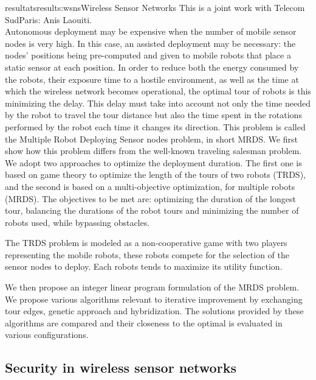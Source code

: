\documentclass{ra2016}
\begin{document}
\begin{module}{resultats}{results:wsns}{Wireless Sensor Networks}
This is a joint work with Telecom SudParis: Anis Laouiti.\\

Autonomous deployment may be expensive when the number of mobile sensor nodes
is very high. In this case, an assisted deployment may be necessary: the nodes' positions
being pre-computed and given to mobile robots that place a static sensor at each position.
In order to reduce both the energy consumed by the robots, their exposure time to a hostile environment, as well as the time at which the wireless network becomes operational, the optimal tour of robots is this  minimizing the delay. This delay must take into account not only the time needed by the robot to travel the tour distance but also the time spent in the rotations performed by the robot each time it changes its direction. This problem is called the Multiple Robot Deploying Sensor nodes problem, in short MRDS. We first show how this problem differs from the well-known traveling salesman problem. 
We adopt two approaches to optimize the deployment duration. The first one is based on game theory to optimize
the length of the tours of two robots (TRDS), and the second is based on a multi-objective
optimization, for multiple robots (MRDS). The objectives to be met are: optimizing the
duration of the longest tour, balancing the durations of the robot tours and minimizing
the number of robots used, while bypassing obstacles. 

The TRDS problem is modeled as a non-cooperative game with two players representing the mobile robots, these robots compete for the selection of the sensor nodes to deploy. Each robots tends to maximize its utility function.

We then propose an integer linear program formulation of the MRDS problem. We propose various algorithms relevant to iterative improvement by exchanging tour edges, genetic approach and hybridization. The solutions provided by these algorithms are compared and their closeness to the optimal is evaluated in various configurations.



\subsection{Security in wireless sensor networks}

\begin{participants}
\end{participants}


\end{module}
\end{document}
